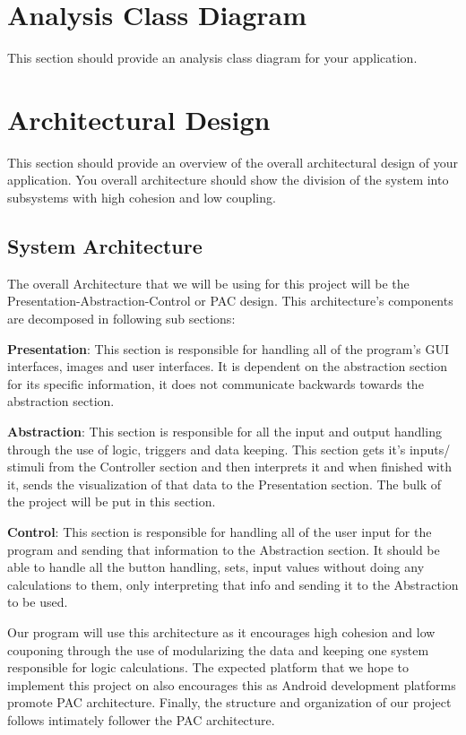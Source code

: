\documentclass[]{article}
\begin{document}
\section{Analysis Class Diagram}
\label{sec:analysis_class_diagram}
This section should provide an analysis class diagram for your application.


\section{Architectural Design}
\label{sec:architectural_design}
This section should provide an overview of the overall architectural design of your application. You overall architecture should show the division of the system into subsystems with high cohesion and low coupling.

\subsection{System Architecture}
\label{sub:system_architecture}

	The overall Architecture that we will be using for this project will be the Presentation-Abstraction-Control or PAC design. This architecture’s components are decomposed in following sub sections:

\textbf{Presentation}: This section is responsible for handling all of the program’s GUI interfaces, images and user interfaces. It is dependent on the abstraction section for its specific information, it does not communicate backwards towards the abstraction section.

\textbf{Abstraction}: This section is responsible for all the input and output handling through the use of logic, triggers and data keeping. This section gets it’s inputs/ stimuli from the Controller section and then interprets it and when finished with it, sends the visualization of that data to the Presentation section. The bulk of the project will be put in this section.

\textbf{Control}: This section is responsible for handling all of the user input for the program and sending that information to the Abstraction section. It should be able to handle all the button handling, sets, input values without doing any calculations to them, only interpreting that info and sending it to the Abstraction to be used.

	Our program will use this architecture as it encourages high cohesion and low couponing through the use of modularizing the data and keeping one system responsible for logic calculations. The expected platform that we hope to implement this project on also encourages this as Android development platforms promote PAC architecture. Finally, the structure and organization of our project follows intimately follower the PAC architecture.
\end{document}
